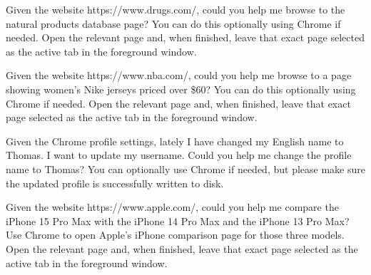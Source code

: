 \begin{instructionbox}
Given the website \textasciigrave{}https://www.drugs.com/\textasciigrave{}, could you help me browse to the natural products database page? You can do this optionally using Chrome if needed. Open the relevant page and, when finished, leave that exact page selected as the active tab in the foreground window.
\end{instructionbox}

\begin{instructionbox}
Given the website \textasciigrave{}https://www.nba.com/\textasciigrave{}, could you help me browse to a page showing women's Nike jerseys priced over \$60? You can do this optionally using Chrome if needed. Open the relevant page and, when finished, leave that exact page selected as the active tab in the foreground window.
\end{instructionbox}

\begin{instructionbox}
Given the Chrome profile settings, lately I have changed my English name to Thomas. I want to update my username. Could you help me change the profile name to \textasciigrave{}Thomas\textasciigrave{}? You can optionally use Chrome if needed, but please make sure the updated profile is successfully written to disk.
\end{instructionbox}

\begin{instructionbox}
Given the website \textasciigrave{}https://www.apple.com/\textasciigrave{}, could you help me compare the iPhone 15 Pro Max with the iPhone 14 Pro Max and the iPhone 13 Pro Max? Use Chrome to open Apple's iPhone comparison page for those three models. Open the relevant page and, when finished, leave that exact page selected as the active tab in the foreground window.
\end{instructionbox}

